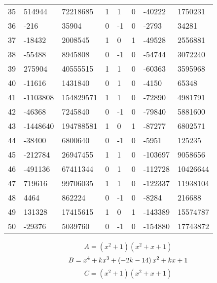 \documentclass{amsart}
\begin{document}
\begin{longtable}{|l|l|l|lllll|}
35&514944&72218685&1&1&0&-40222&1750231\\
36&-216&35904&0&-1&0&-2793&34281\\
37&-18432&2008545&1&0&1&-49528&2556881\\
38&-55488&8945808&0&-1&0&-54744&3072240\\
39&275904&40555515&1&1&0&-60363&3595968\\
40&-11616&1431840&0&1&0&-4150&65348\\
41&-1103808&154829571&1&1&0&-72890&4981791\\
42&-46368&7245840&0&-1&0&-79840&5881600\\
43&-1448640&194788581&1&0&1&-87277&6802571\\
44&-38400&6800640&0&-1&0&-5951&125235\\
45&-212784&26947455&1&1&0&-103697&9058656\\
46&-491136&67411344&0&1&0&-112728&10426644\\
47&719616&99706035&1&1&0&-122337&11938104\\
48&4464&862224&0&-1&0&-8284&216688\\
49&131328&17415615&1&0&1&-143389&15574787\\
50&-29376&5039760&0&-1&0&-154880&17743872\\
\hline
\end{longtable}
$$A=(x^2
 + 1)(x^2
 + x
 + 1)$$
$$B=x^4
 + k\*x^3
 + \left(-2\*k
 - 14\right) \*x^2
 + k\*x
 + 1$$
$$C=(x^2
 + 1)(x^2
 + x
 + 1)$$
\end{document}
